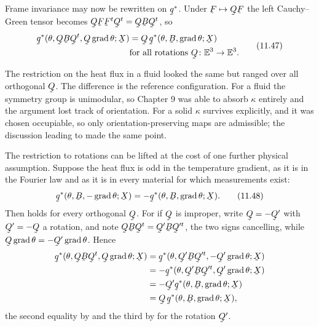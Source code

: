 Frame invariance  may now be rewritten on $\bq^{*}$. Under
$\bF\mapsto\bQ\bF$ the left Cauchy--Green tensor becomes
$\bQ\bF\bF^{t}\bQ^{t}=\bQ\bB\bQ^{t}$, so
\begin{equation}
\begin{aligned}
   \bq^{*}(\theta,\bQ\bB\bQ^{t},\bQ\grad\theta;\bX)
   &=\bQ\,\bq^{*}(\theta,\bB,\grad\theta;\bX)\\
   &\text{for all rotations }\bQ\colon\Vt\to\Vt .
\end{aligned}
   \tag{11.47}\label{eq:11.47}
\end{equation}

\begin{remark}\label{rem:ch11whyrot}
The restriction  on the heat flux in a fluid looked the same
but ranged over all orthogonal $\bQ$. The difference is the reference
configuration. For a fluid the symmetry group is unimodular, so
Chapter 9 was able to absorb $\kappa$ entirely and the argument lost
track of orientation. For a solid $\kappa$ survives explicitly, and it
was chosen occupiable, so only orientation-preserving maps are
admissible; the discussion leading to  made the same point.
\end{remark}

The restriction to rotations can be lifted at the cost of one further
physical assumption. Suppose the heat flux is odd in the temperature
gradient, as it is in the Fourier law  and as it is in every
material for which measurements exist:
\begin{equation}
   \bq^{*}(\theta,\bB,-\grad\theta;\bX)
   =-\bq^{*}(\theta,\bB,\grad\theta;\bX).
   \tag{11.48}\label{eq:11.48}
\end{equation}
Then  holds for every orthogonal $\bQ$. For if $\bQ$ is
improper, write $\bQ=-\bQ'$ with $\bQ'=-\bQ$ a rotation, and note
$\bQ\bB\bQ^{t}=\bQ'\bB\bQ'^{t}$, the two signs cancelling, while
$\bQ\grad\theta=-\bQ'\grad\theta$. Hence
\[
\begin{aligned}
   \bq^{*}(\theta,\bQ\bB\bQ^{t},\bQ\grad\theta;\bX)
   &=\bq^{*}(\theta,\bQ'\bB\bQ'^{t},-\bQ'\grad\theta;\bX)\\
   &=-\bq^{*}(\theta,\bQ'\bB\bQ'^{t},\bQ'\grad\theta;\bX)\\
   &=-\bQ'\bq^{*}(\theta,\bB,\grad\theta;\bX)\\
   &=\bQ\,\bq^{*}(\theta,\bB,\grad\theta;\bX),
\end{aligned}
\]
the second equality by  and the third by  for the
rotation $\bQ'$.

